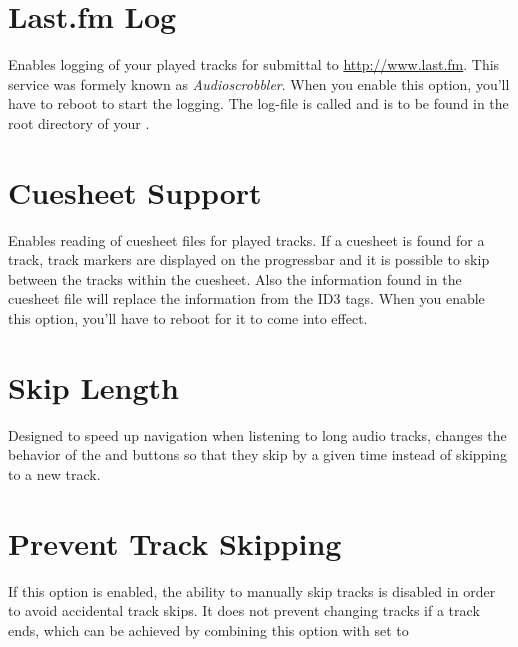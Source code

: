 \section{Last.fm Log}
  Enables logging of your played tracks for submittal to 
  \url{http://www.last.fm}. This service was formely known as 
  \emph{Audioscrobbler}. When you enable this option, you'll have to reboot to
  start the logging. The log-file is called 
  and is to be found in the root directory of your \dap{}.

\section{Cuesheet Support}
  Enables reading of cuesheet files for played tracks. If a cuesheet is found
  for a track, track markers are displayed on the progressbar and it is
  possible to skip between the tracks within the cuesheet. Also the information
  found in the cuesheet file will replace the information from the ID3 tags.
  When you enable this option, you'll have to reboot for it to come into
  effect.
  
\section{Skip Length}
  Designed to speed up navigation when listening to long audio tracks,
   changes the behavior of
  the \ActionWpsSkipPrev{} and \ActionWpsSkipNext{} buttons so that they skip
  by a given time instead of skipping to a new track.

\section{Prevent Track Skipping}
  If this option is enabled, the ability to manually skip tracks is disabled
  in order to avoid accidental track skips. It does not prevent changing tracks
  if a track ends, which can be achieved by combining this option with
   set to 

